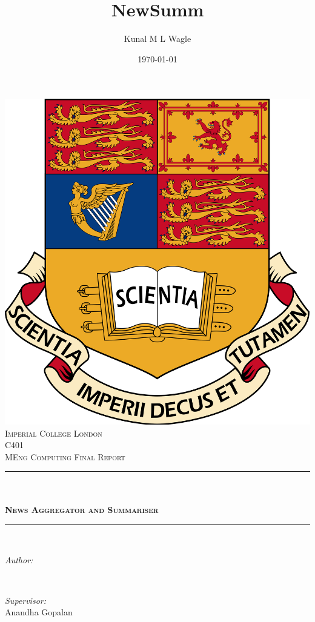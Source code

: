 \documentclass[12pt]{article}
\title{NewSumm}								%
\author{Kunal M L Wagle}								%
\date{\today}											%
\makeatletter
\let\thetitle\@title
\let\theauthor\@author
\makeatother
\begin{document}

\begin{titlepage}
	\centering
    \vspace*{0.5 cm}
    \includegraphics[scale = 0.05]{Imperial_College_London_crest.png}\\[1.0 cm]	%
    \textsc{\LARGE Imperial College London}\\[2.0 cm]	%
	\textsc{\Large C401}\\[0.5 cm]				%
	\textsc{\large MEng Computing Final Report}\\[0.5 cm]				%
	\rule{\linewidth}{0.2 mm} \\[0.4 cm]
	{ \huge \bfseries \thetitle \\[0.4cm] \textsc{\large News Aggregator and Summariser}}\\
	\rule{\linewidth}{0.2 mm} \\[1.5 cm]
	
	\begin{minipage}{0.4\textwidth}
		\begin{flushleft} \large
			\emph{Author:}\\
			\theauthor
			\end{flushleft}
			\end{minipage}~
			\begin{minipage}{0.4\textwidth}
			\begin{flushright} \large
			\emph{Supervisor:} \\
			Anandha Gopalan									%
		\end{flushright}
	\end{minipage}\\[2 cm]
	

\end{titlepage}
\end{document}
